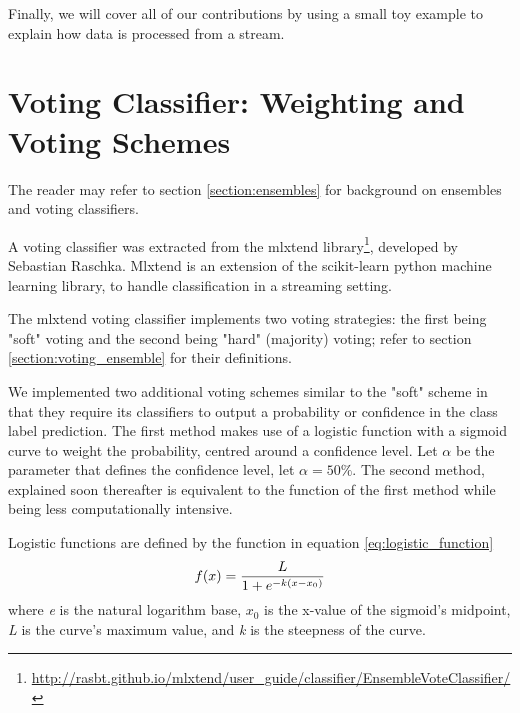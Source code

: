 Finally, we will cover all of our contributions by using a small toy example to explain how data is processed from a stream.


\section{Voting Classifier: Weighting and Voting Schemes \label{section:new_voting_strategy}}

The reader may refer to section \ref{section:ensembles} for background on ensembles and voting classifiers.

A voting classifier was extracted from the mlxtend library\footnote{\url{http://rasbt.github.io/mlxtend/user_guide/classifier/EnsembleVoteClassifier/}}, developed by Sebastian Raschka. Mlxtend is an extension of the scikit-learn python machine learning library, to handle classification in a streaming setting.

The mlxtend voting classifier implements two voting strategies: the first being "soft" voting and the second being "hard" (majority) voting; refer to section \ref{section:voting_ensemble} for their definitions.

We implemented two additional voting schemes similar to the "soft" scheme in that they require its classifiers to output a probability or confidence in the class label prediction. The first method makes use of a logistic function with a sigmoid curve to weight the probability, centred around a  confidence level. Let $\alpha$ be the parameter that defines the confidence level, let $\alpha=50\%$. The second method, explained soon thereafter is equivalent to the function of the first method while being less computationally intensive.


Logistic functions are defined by the function in equation \ref{eq:logistic_function}
\begin{equation}
    f(x)=\frac{L}{1+e^{-k(x-x_0)}}\\ 
    \label{eq:logistic_function}
\end{equation}
where \textit{e} is the natural logarithm base, \textit{$x_0$} is the x-value of the sigmoid's midpoint, \textit{L} is the curve's maximum value, and \textit{k} is the steepness of the curve.

